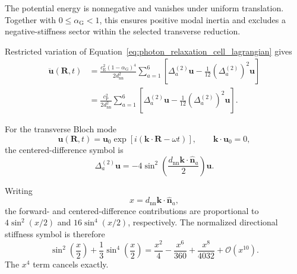 The potential energy is nonnegative and vanishes under uniform translation.
Together with
\(0\leq\alpha_{\mathrm G}<1\),
this ensures positive modal inertia and excludes a negative-stiffness sector
within the selected transverse reduction.

Restricted variation of
Equation~\eqref{eq:photon_relaxation_cell_lagrangian} gives
\begin{align}
    \ddot{\mathbf u}(\mathbf R,t)
    &=
    \frac{
        c_{\mathrm E}^2
        \left(
            1-\alpha_{\mathrm G}
        \right)^4
    }{
        2d_{\mathrm{nn}}^2
    }
    \sum_{a=1}^{6}
    \left[
        \Delta_a^{(2)}\mathbf u
        -
        \frac{1}{12}
        \left(
            \Delta_a^{(2)}
        \right)^2
        \mathbf u
    \right]
    \nonumber\\
    &=
    \frac{
        c_{\mathrm P}^2
    }{
        2d_{\mathrm{nn}}^2
    }
    \sum_{a=1}^{6}
    \left[
        \Delta_a^{(2)}\mathbf u
        -
        \frac{1}{12}
        \left(
            \Delta_a^{(2)}
        \right)^2
        \mathbf u
    \right].
    \label{eq:photon_relaxation_extended_lattice_equation}
\end{align}

For the transverse Bloch mode
\begin{equation}
    \mathbf u(\mathbf R,t)
    =
    \mathbf u_0
    \exp
    \left[
        i
        \left(
            \mathbf k\cdot\mathbf R
            -
            \omega t
        \right)
    \right],
    \qquad
    \mathbf k\cdot\mathbf u_0
    =
    0,
    \label{eq:photon_relaxation_extended_bloch_mode}
\end{equation}
the centered-difference symbol is
\begin{equation}
    \Delta_a^{(2)}
    \mathbf u
    =
    -4
    \sin^2
    \left(
        \frac{
            d_{\mathrm{nn}}
            \mathbf k\cdot
            \widehat{\mathbf n}_a
        }{
            2
        }
    \right)
    \mathbf u.
    \label{eq:photon_relaxation_second_difference_symbol}
\end{equation}

Writing
\[
    x
    =
    d_{\mathrm{nn}}
    \mathbf k\cdot
    \widehat{\mathbf n}_a,
\]
the forward- and centered-difference contributions are proportional to
\(4\sin^2(x/2)\)
and
\(16\sin^4(x/2)\), respectively. The normalized directional stiffness
symbol is therefore
\begin{equation}
    \sin^2
    \left(
        \frac{x}{2}
    \right)
    +
    \frac{1}{3}
    \sin^4
    \left(
        \frac{x}{2}
    \right)
    =
    \frac{x^2}{4}
    -
    \frac{x^6}{360}
    +
    \frac{x^8}{4032}
    +
    \mathcal O
    \left(
        x^{10}
    \right).
    \label{eq:photon_relaxation_suppressed_symbol_expansion}
\end{equation}
The \(x^4\) term cancels exactly.

